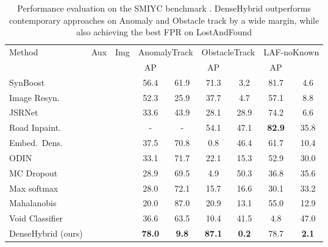 \documentclass[runningheads]{llncs}
\newcommand{\cmark}{\ding{51}}
\newcommand{\xmark}{\ding{55}}
\begin{document}
\begin{table}[h]
\begin{center}
\caption{Performance evaluation on the SMIYC benchmark \cite{chan21arxiv}.
DenseHybrid outperforms contemporary approaches on Anomaly and Obstacle track by a wide margin, while also achieving the best FPR on LostAndFound
}
\label{table:smiyc}
\begin{tabular}{lcccccccc}
\hline\hline
\multicolumn{1}{l}{\multirow{2}{*}{Method}} & \multicolumn{1}{c}{\multirow{2}{*}{Aux}} & \multicolumn{1}{c|}{\multirow{2}{*}{Img}} & \multicolumn{2}{c|}{AnomalyTrack} & \multicolumn{2}{c|}{ObstacleTrack} & \multicolumn{2}{c}{LAF-noKnown}\\
\multicolumn{1}{l}{} & \multicolumn{1}{c}{data} & \multicolumn{1}{c|}{rsyn.} & AP & \multicolumn{1}{c|}{} & AP & \multicolumn{1}{c|}{}  & AP & \multicolumn{1}{c}{}  \\\hline \hline
SynBoost \cite{biase21cvpr} & \cmark& \cmark & 56.4 & 61.9 &  71.3 & 3.2 &  81.7& 4.6\\
Image Resyn. \cite{lis19iccv} & \xmark& \cmark& 52.3 & 25.9 & 37.7 & 4.7 & 57.1& 8.8\\
JSRNet \cite{vojir21iccv} & \xmark&  \cmark & 33.6& 43.9  & 28.1 & 28.9 & 74.2 & 6.6\\
Road Inpaint. \cite{lis20arxiv} & \xmark& \cmark & - & - & 54.1 & 47.1 & \textbf{82.9} & 35.8\\
Embed.\ Dens.\ \cite{blum21ijcv} & \xmark&  \xmark & 37.5 & 70.8  & 0.8 & 46.4 & 61.7 &10.4 \\
ODIN \cite{liang18iclr} & \xmark&  \xmark & 33.1 & 71.7 & 22.1 & 15.3 & 52.9 &  30.0 \\
MC Dropout \cite{kendall17nips} & \xmark& \xmark & 28.9 & 69.5 & 4.9 & 50.3 & 36.8 & 35.6 \\
Max softmax \cite{hendrycks17iclr} & \xmark&  \xmark & 28.0 & 72.1 & 15.7 & 16.6  & 30.1 & 33.2 \\
Mahalanobis \cite{lee18nips} & \xmark&  \xmark & 20.0 & 87.0  &  20.9 & 13.1 & 55.0 & 12.9\\
Void Classifier \cite{blum21ijcv} & \cmark& \xmark & 36.6 & 63.5 & 10.4 & 41.5 & 4.8  & 47.0 \\
\hline
DenseHybrid (ours) & \cmark&  \xmark & \textbf{78.0} & \textbf{9.8}  & \textbf{87.1} & \textbf{0.2} & 78.7 & \textbf{2.1} \\ \hline
\end{tabular}
\end{center}
\end{table}
\end{document}
